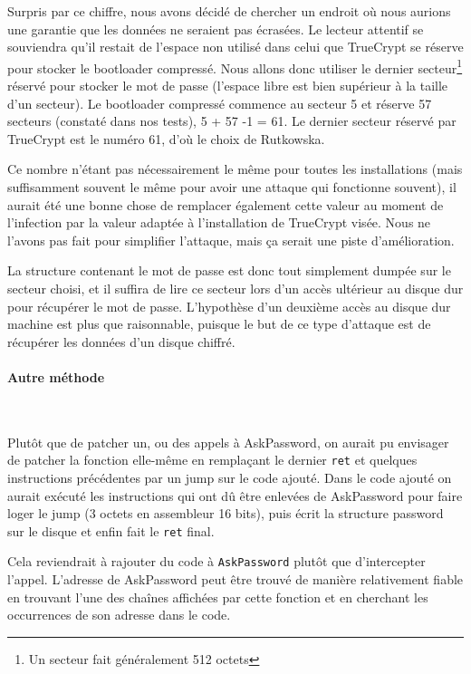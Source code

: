 \documentclass[12pt,a4paper]{article}
\begin{document}
Surpris par ce chiffre, nous avons décidé de chercher un endroit où nous aurions
une garantie que les données ne seraient pas écrasées. Le lecteur attentif se
souviendra qu'il restait de l'espace non utilisé dans celui que TrueCrypt se 
réserve pour stocker le bootloader compressé. Nous allons donc utiliser le dernier
secteur\footnote{Un secteur fait généralement 512 octets} réservé pour stocker
le mot de passe (l'espace libre est bien supérieur à la taille d'un secteur).
Le bootloader compressé commence au secteur 5 et réserve 57 secteurs (constaté
dans nos tests), 5 + 57 -1 = 61. Le dernier secteur réservé par TrueCrypt est le
numéro 61, d'où le choix de Rutkowska.

Ce nombre n'étant pas nécessairement le même pour toutes les installations (mais
suffisamment souvent le même pour avoir une attaque qui fonctionne souvent), il
aurait été une bonne chose de remplacer également cette valeur au moment de
l'infection par la valeur adaptée à l'installation de TrueCrypt visée. Nous ne
l'avons pas fait pour simplifier l'attaque, mais ça serait une piste
d'amélioration.

La structure contenant le mot de passe est donc tout simplement dumpée sur le
secteur choisi, et il suffira de lire ce secteur lors d'un accès ultérieur au
disque dur pour récupérer le mot de passe. L'hypothèse d'un deuxième accès au
disque dur machine est plus que raisonnable, puisque le but de ce type d'attaque
est de récupérer les données d'un disque chiffré.

\paragraph{Autre méthode}~

Plutôt que de patcher un, ou des appels à AskPassword, on aurait pu envisager
de patcher la fonction elle-même en remplaçant le dernier \texttt{ret} et 
quelques instructions précédentes par un jump sur le code ajouté. Dans le code
ajouté on aurait exécuté les instructions qui ont dû être enlevées de AskPassword
pour faire loger le jump (3 octets en assembleur 16 bits), puis écrit la structure
password sur le disque et enfin fait le \texttt{ret} final.

Cela reviendrait à rajouter du code à \texttt{AskPassword} plutôt que
d'intercepter l'appel. L'adresse de AskPassword peut être trouvé de manière
relativement fiable en trouvant l'une des chaînes affichées par cette fonction
et en cherchant les occurrences de son adresse dans le code.
\end{document}
